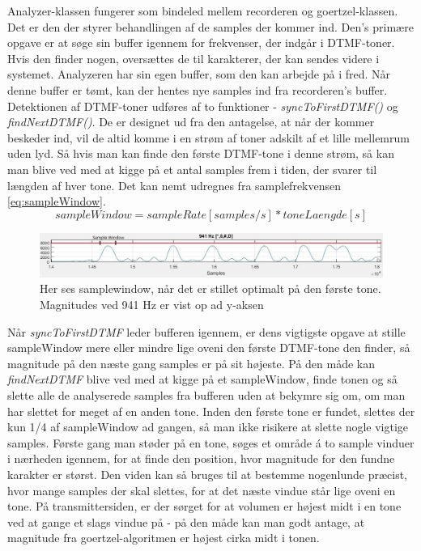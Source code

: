 Analyzer-klassen fungerer som bindeled mellem recorderen og goertzel-klassen. Det er den der styrer behandlingen af de samples der kommer ind. Den's primære opgave er at søge sin buffer igennem for frekvenser, der indgår i DTMF-toner. Hvis den finder nogen, oversættes de til karakterer, der kan sendes videre i systemet. Analyzeren har sin egen buffer, som den kan arbejde på i fred. Når denne buffer er tømt, kan der hentes nye samples ind fra recorderen's buffer. \\

Detektionen af DTMF-toner udføres af to funktioner - \textit{syncToFirstDTMF()} og \textit{findNextDTMF()}. De er designet ud fra den antagelse, at når der kommer beskeder ind, vil de altid komme i en strøm af toner adskilt af et lille mellemrum uden lyd. Så hvis man kan finde den første DTMF-tone i denne strøm, så kan man blive ved med at kigge på et antal samples frem i tiden, der svarer til længden af hver tone. Det kan nemt udregnes fra samplefrekvensen \eqref{eq:sampleWindow}. \\

\begin{equation}
sampleWindow=sampleRate[samples/s]*toneLaengde[s]
\label{eq:sampleWindow}
\end{equation}

\begin{figure}[h]
\centering
\includegraphics[scale=0.5]{Billeder/Samplewindow.PNG}
\caption{Her ses samplewindow, når det er stillet optimalt på den første tone. Magnitudes ved 941 Hz er vist op ad y-aksen}
\label{fig:Samplewindow}
\end{figure}
Når \textit{syncToFirstDTMF} leder bufferen igennem, er dens vigtigste opgave at stille sampleWindow mere eller mindre lige oveni den første DTMF-tone den finder, så magnitude på den næste gang samples er på sit højeste. På den måde kan \textit{findNextDTMF} blive ved med at kigge på et sampleWindow, finde tonen og så slette alle de analyserede samples fra bufferen uden at bekymre sig om, om man har slettet for meget af en anden tone. Inden den første tone er fundet, slettes der kun 1/4 af sampleWindow ad gangen, så man ikke risikere at slette nogle vigtige samples. Første gang man støder på en tone, søges et område á to sample vinduer i nærheden igennem, for at finde den position, hvor magnitude for den fundne karakter er størst. Den viden kan så bruges til at bestemme nogenlunde præcist, hvor mange samples der skal slettes, for at det næste vindue står lige oveni en tone. På transmittersiden, er der sørget for at volumen er højest midt i en tone ved at gange et slags vindue på - på den måde kan man godt antage, at magnitude fra goertzel-algoritmen er højest cirka midt i tonen.

